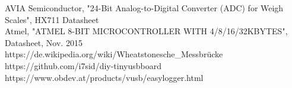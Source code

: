 \documentclass[12pt,journal]{IEEEtran}
\begin{document}

%
%
%


\begin{thebibliography}{1}

AVIA Semiconductor, "24-Bit Analog-to-Digital Converter (ADC) for Weigh Scales", HX711 Datasheet
\\
Atmel, "ATMEL 8-BIT MICROCONTROLLER WITH 4/8/16/32KBYTES", Datasheet, Nov. 2015
\\
https://de.wikipedia.org/wiki/Wheatstonesche\_Messbrücke
\\
https://github.com/i7sid/diy-tinyusbboard
\\
https://www.obdev.at/products/vusb/easylogger.html


\end{thebibliography}
\end{document}
